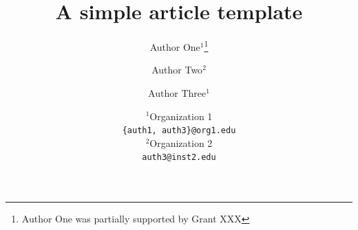 \documentclass{article}
\begin{document}
\usepackage{graphicx, color}
\graphicspath{{fig/}}

\usepackage{algorithm, algpseudocode} %
\usepackage{mathrsfs} %

\usepackage{lipsum}

\title{A simple article template}
\author{Author One$^1$\thanks{Author One was partially supported by Grant XXX} \and Author Two$^2$ \and Author Three$^1$}

\date{
	$^1$Organization 1 \\ \texttt{\{auth1, auth3\}@org1.edu}\\%
	$^2$Organization 2 \\ \texttt{auth3@inst2.edu}\\[2ex]%
}
\end{document}
